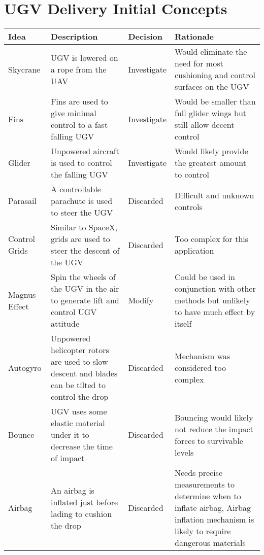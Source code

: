 \documentclass[]{auvsi_doc}
\begin{document}
\section{UGV Delivery Initial Concepts}
\begin{center}
\begin{longtable}[H]{|p{}|p{}|p{}|p{}|}
\hline
\textbf{Idea}	&	\textbf{Description}	&	\textbf{Decision} &	\textbf{Rationale} \\
\hline
Skycrane & UGV is lowered on a rope from the UAV & Investigate & Would eliminate the need for most cushioning and control surfaces on the UGV\\
\hline
Fins & Fins are used to give minimal control to a fast falling UGV & Investigate & Would be smaller than full glider wings but still allow decent control\\
\hline
Glider & Unpowered aircraft is used to control the falling UGV & Investigate & Would likely provide the greatest amount to control\\
\hline
Parasail & A controllable parachute is used to steer the UGV & Discarded & Difficult and unknown controls \\
\hline
Control Grids & Similar to SpaceX, grids are used to steer the descent of the UGV & Discarded & Too complex for this application \\
\hline
Magnus Effect & Spin the wheels of the UGV in the air to generate lift and control UGV attitude & Modify & Could be used in conjunction with other methods but unlikely to have much effect by itself\\
\hline
Autogyro & Unpowered helicopter rotors are used to slow descent and blades can be tilted to control the drop & Discarded & Mechanism was considered too complex \\
\hline
Bounce & UGV uses some elastic material under it to decrease the time of impact & Discarded & Bouncing would likely not reduce the impact forces to survivable levels \\
\hline
Airbag & An airbag is inflated just before lading to cushion the drop & Discarded & Needs precise measurements to determine when to inflate airbag, Airbag inflation mechanism is likely to require dangerous materials\\

\end{longtable}
\end{center}
\end{document}
